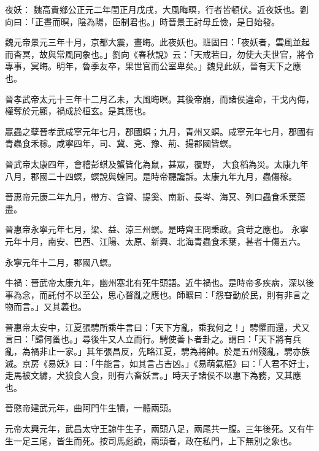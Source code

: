 \begin{pinyinscope}
 夜妖：
 魏高貴鄉公正元二年閏正月戊戌，大風晦暝，行者皆頓伏。近夜妖也。劉向曰：「正晝而暝，陰為陽，臣制君也。」時晉景王討毋丘儉，是日始發。



 魏元帝景元三年十月，京都大震，晝晦。此夜妖也。班固曰：「夜妖者，雲風並起而杳冥，故與常風同象也。」劉向《春秋說》云：「天戒若曰，勿使大夫世官，將令專事，冥晦。明年，魯季友卒，果世官而公室卑矣。」魏見此妖，晉有天下之應
 也。



 晉孝武帝太元十三年十二月乙未，大風晦暝。其後帝崩，而諸侯違命，干戈內侮，權奪於元顯，禍成於桓玄。是其應也。



 蠃蟲之孽晉孝武咸寧元年七月，郡國螟；九月，青州又螟。咸寧元年七月，郡國有青蟲食禾稼。咸寧四年，司、冀、兗、豫、荊、揚郡國皆螟。



 晉武帝太康四年，會稽彭蜞及蟹皆化為鼠，甚眾，覆野，
 大食稻為災。太康九年八月，郡國二十四螟，螟說與蝗同。是時帝聽讒訴。太康九年九月，蟲傷稼。



 晉惠帝元康二年九月，帶方、含資、提奚、南新、長岑、海冥、列口蟲食禾葉蕩盡。



 晉惠帝永寧元年七月，梁、益、涼三州螟。是時齊王冏秉政。貪苛之應也。
 永寧元年十月，南安、巴西、江陽、太原、新興、北海青蟲食禾葉，甚者十傷五六。



 永寧元年十二月，郡國八螟。



 牛禍：晉武帝太康九年，幽州塞北有死牛頭語。近牛禍也。是時帝多疾病，深以後事為念，而託付不以至公，思心瞀亂之應也。師曠曰：「怨昚動於民，則有非言之物而言。」又其義也。



 晉惠帝太安中，江夏張騁所乘牛言曰：「天下方亂，乘我何之！」騁懼而還，犬又言曰：「歸何蚤也。」尋後牛又人立而行。騁使善卜者卦之。謂曰：「天下將有兵亂，為禍非止一家。」其年張昌反，先略江夏，騁為將帥。於是五州殘亂，騁亦族滅。京房《易妖》曰：「牛能言，如其言占吉凶。」《易萌氣樞》曰：「人君不好士，走馬被文繡，犬狼食人食，則有六畜妖言。」時天子諸侯不以惠下為務，又其應也。



 晉愍帝建武元年，曲阿門牛生犢，一體兩頭。



 元帝太興元年，武昌太守王諒牛生子，兩頭八足，兩尾共一腹。三年後死。又有牛生一足三尾，皆生而死。按司馬彪說，兩頭者，政在私門，上下無別之象也。




\end{pinyinscope}
